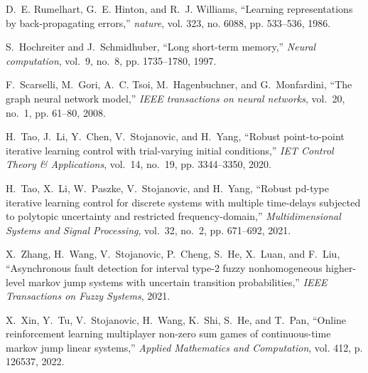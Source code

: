 \documentclass{article}
\begin{document}
\begin{thebibliography}{10}
D.~E. Rumelhart, G.~E. Hinton, and R.~J. Williams, ``Learning representations
  by back-propagating errors,'' \emph{nature}, vol. 323, no. 6088, pp.
  533--536, 1986.

S.~Hochreiter and J.~Schmidhuber, ``Long short-term memory,'' \emph{Neural
  computation}, vol.~9, no.~8, pp. 1735--1780, 1997.

F.~Scarselli, M.~Gori, A.~C. Tsoi, M.~Hagenbuchner, and G.~Monfardini, ``The
  graph neural network model,'' \emph{IEEE transactions on neural networks},
  vol.~20, no.~1, pp. 61--80, 2008.

H.~Tao, J.~Li, Y.~Chen, V.~Stojanovic, and H.~Yang, ``Robust point-to-point
  iterative learning control with trial-varying initial conditions,'' \emph{IET
  Control Theory \& Applications}, vol.~14, no.~19, pp. 3344--3350, 2020.

H.~Tao, X.~Li, W.~Paszke, V.~Stojanovic, and H.~Yang, ``Robust pd-type
  iterative learning control for discrete systems with multiple time-delays
  subjected to polytopic uncertainty and restricted frequency-domain,''
  \emph{Multidimensional Systems and Signal Processing}, vol.~32, no.~2, pp.
  671--692, 2021.

X.~Zhang, H.~Wang, V.~Stojanovic, P.~Cheng, S.~He, X.~Luan, and F.~Liu,
  ``Asynchronous fault detection for interval type-2 fuzzy nonhomogeneous
  higher-level markov jump systems with uncertain transition probabilities,''
  \emph{IEEE Transactions on Fuzzy Systems}, 2021.

X.~Xin, Y.~Tu, V.~Stojanovic, H.~Wang, K.~Shi, S.~He, and T.~Pan, ``Online
  reinforcement learning multiplayer non-zero sum games of continuous-time
  markov jump linear systems,'' \emph{Applied Mathematics and Computation},
  vol. 412, p. 126537, 2022.

\end{thebibliography}
\end{document}

